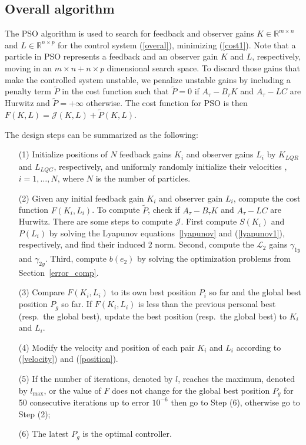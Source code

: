 \documentclass{amsart}
\numberwithin{equation}{section}
\newcommand{\R}{{\mathbb{R}}}
\begin{document}
\subsection{Overall algorithm} \label{algorithm}

The PSO algorithm is used to search for feedback and observer gains $K\in\R^{m\times{n}}$ and $L\in\R^{n\times{p}}$ 
for the control system (\ref{overal}), minimizing (\ref{cost1}). 
Note that a particle in PSO represents a feedback and an observer gain $K$ and $L$, respectively, moving in an $m\times{n}+n\times{p}$ dimensional search space. 
To discard those gains that make the controlled system unstable, we penalize unstable gains by including a penalty term $\widetilde{P}$ in the cost function
such that $\widetilde{P} = 0$ if $A_\tau - B_\tau K$ and $A_\tau-LC$ are Hurwitz and $\widetilde{P} = +\infty$ otherwise. 
The cost function for PSO is then $F(K,L) = \mathcal{J}(K,L) + \widetilde{P}(K,L)$.

The design steps can be summarized as the following:
\begin{itemize}
\item[(1)] Initialize positions of $N$ feedback gains $K_i$ and observer gains $L_i$ by $K_{LQR}$ and $L_{LQG}$, respectively, and uniformly randomly initialize their velocities , $i=1,\ldots,N$, where $N$ is the number of particles.
\item[(2)] Given any initial feedback gain $K_i$ and observer gain $L_i$, compute the cost function $F(K_i,L_i)$.
To compute $\widetilde{P}$, check if $A_\tau - B_\tau K$ and $A_\tau-LC$ are Hurwitz.
There are some steps to compute $\mathcal{J}$.
First compute $S(K_i)$ and $P(L_i)$ by solving the Lyapunov equations~\eqref{lyapunov} and (\ref{lyapunov1}), respectively, and find their induced 2 norm.
Second, compute the $\mathcal{L}_2$ gains $\gamma_{1y}$ and $\gamma_{2y}$. Third, compute $b(e_2)$ by solving the optimization problems from Section~\ref{error_comp}.
\item[(3)] Compare $F(K_i,L_i)$ to its own best position $P_i$ so far and the global best position $P_g$ so far.
If $F(K_i,L_i)$ is less than the previous personal best (resp.\ the global best), update the best position (resp.\ the global best) to $K_i$ and $L_i$.
\item[(4)] Modify the velocity and position of each pair $K_i$ and $L_i$ according to (\ref{velocity}) and (\ref{position}).
\item[(5)] If the number of iterations, denoted by $l$, reaches the maximum, denoted by $l_{\max}$, or the value of $F$ does not change for the global best position $P_g$ for 50 consecutive iterations up to error $10^{-6}$ then go to Step (6), otherwise go to Step (2);
\item[(6)] The latest $P_g$ is the optimal controller.
\end{itemize}
\end{document}

